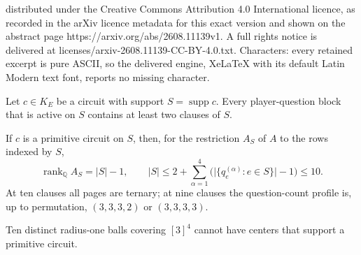 \documentclass[10pt,a4paper]{amsart}
\newcommand{\Q}{\mathbb{Q}}
\newcommand{\card}[1]{\lvert #1\rvert}
\newcommand{\rank}{\operatorname{rank}}
\newcommand{\supp}{\operatorname{supp}}
\begin{document}
distributed under the Creative Commons Attribution 4.0 International licence, as recorded in the arXiv licence metadata for this exact version and shown on the abstract page https://arxiv.org/abs/2608.11139v1. A full rights notice is delivered at licenses/arxiv-2608.11139-CC-BY-4.0.txt. Characters: every retained excerpt is pure ASCII, so the delivered engine, XeLaTeX with its default Latin Modern text font, reports no missing character.
\begin{lemma}
\label{lem:no-singleton-block}
Let \(c\in K_E\) be a circuit with support \(S=\supp c\).  Every
player-question block that is active on \(S\) contains at least two clauses
of \(S\).
\end{lemma}

\begin{proposition}\label{prop:rank-cap}
If \(c\) is a primitive circuit on \(S\), then, for the restriction \(A_S\)
of \(A\) to the rows indexed by \(S\),
\[
  \rank_{\Q}A_S=\card S-1,
  \qquad
  \card S\leq
  2+\sum_{\alpha=1}^{4}
  \bigl(\card{\{q_e^{(\alpha)}:e\in S\}}-1\bigr)\leq10.
\]
At ten clauses all pages are ternary; at nine clauses the question-count
profile is, up to permutation, \((3,3,3,2)\) or \((3,3,3,3)\).
\end{proposition}

\begin{proposition}\label{prop:ten-cover}
Ten distinct radius-one balls covering \([3]^4\) cannot have centers that
support a primitive circuit.
\end{proposition}
\end{document}
